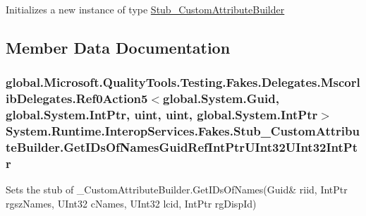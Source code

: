 Initializes a new instance of type \hyperlink{class_system_1_1_runtime_1_1_interop_services_1_1_fakes_1_1_stub___custom_attribute_builder}{Stub\-\_\-\-Custom\-Attribute\-Builder}



\subsection{Member Data Documentation}
\hypertarget{class_system_1_1_runtime_1_1_interop_services_1_1_fakes_1_1_stub___custom_attribute_builder_ada481a56c17e85f68907098a4de2083b}{
\subsubsection[{Get\-I\-Ds\-Of\-Names\-Guid\-Ref\-Int\-Ptr\-U\-Int32\-U\-Int32\-Int\-Ptr}]{\setlength{\rightskip}{0pt plus 5cm}global.\-Microsoft.\-Quality\-Tools.\-Testing.\-Fakes.\-Delegates.\-Mscorlib\-Delegates.\-Ref0\-Action5$<$global.\-System.\-Guid, global.\-System.\-Int\-Ptr, uint, uint, global.\-System.\-Int\-Ptr$>$ System.\-Runtime.\-Interop\-Services.\-Fakes.\-Stub\-\_\-\-Custom\-Attribute\-Builder.\-Get\-I\-Ds\-Of\-Names\-Guid\-Ref\-Int\-Ptr\-U\-Int32\-U\-Int32\-Int\-Ptr}}\label{class_system_1_1_runtime_1_1_interop_services_1_1_fakes_1_1_stub___custom_attribute_builder_ada481a56c17e85f68907098a4de2083b}


Sets the stub of \-\_\-\-Custom\-Attribute\-Builder.\-Get\-I\-Ds\-Of\-Names(Guid\& riid, Int\-Ptr rgsz\-Names, U\-Int32 c\-Names, U\-Int32 lcid, Int\-Ptr rg\-Disp\-Id)

